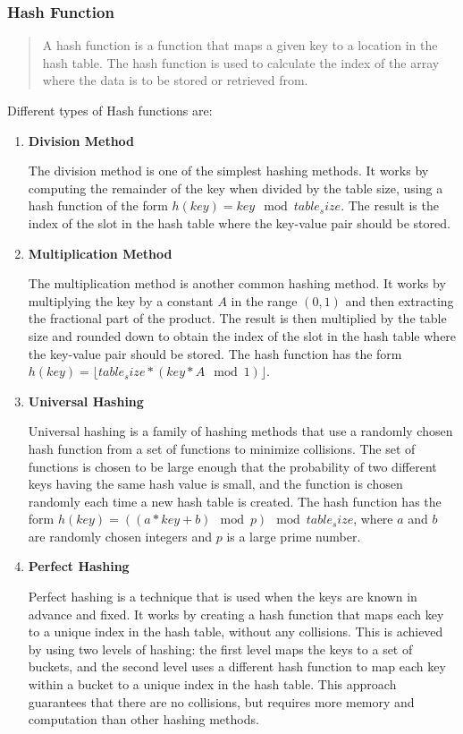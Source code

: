 \documentclass[11pt]{article}
\begin{document}
\subsubsection{Hash Function}
\begin{quote}
    A hash function is a function that maps a given key to a location in the
    hash table. The hash function is used to calculate the index of the array
    where the data is to be stored or retrieved from.
\end{quote}

Different types of Hash functions are: 


\begin{enumerate}
    \item \textbf{Division Method}
    
    The division method is one of the simplest hashing methods. It works by computing the remainder of the key when divided by the table size, using a hash function of the form $h(key) = key \mod table_size$. The result is the index of the slot in the hash table where the key-value pair should be stored.
    
    \item \textbf{Multiplication Method}
    
    The multiplication method is another common hashing method. It works by multiplying the key by a constant $A$ in the range $(0, 1)$ and then extracting the fractional part of the product. The result is then multiplied by the table size and rounded down to obtain the index of the slot in the hash table where the key-value pair should be stored. The hash function has the form $h(key) = \lfloor table_size * (key * A \mod 1) \rfloor$.
    
    \item \textbf{Universal Hashing}
    
    Universal hashing is a family of hashing methods that use a randomly chosen hash function from a set of functions to minimize collisions. The set of functions is chosen to be large enough that the probability of two different keys having the same hash value is small, and the function is chosen randomly each time a new hash table is created. The hash function has the form $h(key) = ((a * key + b) \mod p) \mod table_size$, where $a$ and $b$ are randomly chosen integers and $p$ is a large prime number.
    
    \item \textbf{Perfect Hashing}
    
    Perfect hashing is a technique that is used when the keys are known in advance and fixed. It works by creating a hash function that maps each key to a unique index in the hash table, without any collisions. This is achieved by using two levels of hashing: the first level maps the keys to a set of buckets, and the second level uses a different hash function to map each key within a bucket to a unique index in the hash table. This approach guarantees that there are no collisions, but requires more memory and computation than other hashing methods.
    \end{enumerate}
\end{document}
